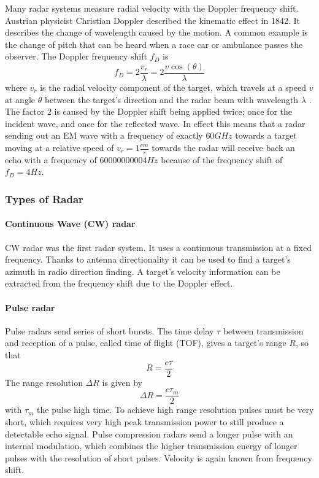 Many radar systems measure radial velocity with the Doppler frequency
shift. Austrian physicist Christian Doppler described the kinematic
effect in 1842. It describes the change of wavelength caused by the
motion. A common example is the change of pitch that can be heard when a
race car or ambulance passes the observer. The Doppler frequency shift
\(f_D\) is \[
f_D = 2 \frac{v_r}{\lambda} = 2 \frac{v \cos ( \theta )}{\lambda}
\] where \(v_r\) is the radial velocity component of the target, which
travels at a speed \(v\) at angle \(\theta\) between the target's
direction and the radar beam with wavelength \(\lambda\)
\cite{Skolnik2008}. The factor \(2\) is caused by the Doppler shift
being applied twice; once for the incident wave, and once for the
reflected wave. In effect this means that a radar sending out an EM wave
with a frequency of exactly \(60GHz\) towards a target moving at a
relative speed of \(v_r = 1\frac{cm}{s}\) towards the radar will receive
back an echo with a frequency of \(60000000004 Hz\) because of the
frequency shift of \(f_D = 4 Hz\).

\subsubsection{Types of Radar}\label{types-of-radar}

\paragraph{Continuous Wave (CW) radar}\label{continuous-wave-cw-radar}

CW radar was the first radar system. It uses a continuous transmission
at a fixed frequency. Thanks to antenna directionality it can be used to
find a target's azimuth in radio direction finding. A target's velocity
information can be extracted from the frequency shift due to the Doppler
effect.

\paragraph{Pulse radar}\label{pulse-radar}

Pulse radars send series of short bursts. The time delay \(\tau\)
between transmission and reception of a pulse, called time of flight
(TOF), gives a target's range \(R\), so that \[ R = \frac{c\tau}{2} \]
The range resolution \(\Delta R\) is given by
\[\Delta R = \frac{c\tau_m}{2}\] with \(\tau_m\) the pulse high time. To
achieve high range resolution pulses must be very short, which requires
very high peak transmission power to still produce a detectable echo
signal. Pulse compression radars send a longer pulse with an internal
modulation, which combines the higher transmission energy of longer
pulses with the resolution of short pulses. Velocity is again known from
frequency shift.

